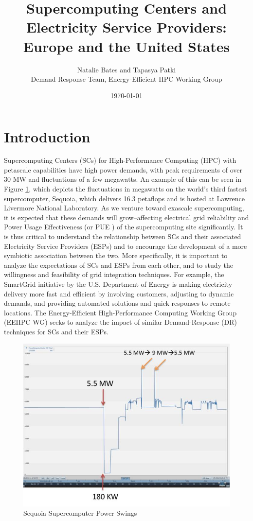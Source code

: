 \documentclass{article}
\title{Supercomputing Centers and Electricity Service Providers: Europe and the United States}
\author{Natalie Bates and Tapasya Patki \\ Demand Response Team, Energy-Efficient HPC Working Group}
\date{\today}
\begin{document}
\fontsize{10}{15}
\selectfont
\maketitle
\section{Introduction}

Supercomputing Centers (SCs) for High-Performance Computing (HPC) with petascale capabilities have high power demands, with peak requirements of over 30 MW and fluctuations of a few megawatts. An example of this can be seen in Figure \ref{fig:seq}, which depicts the fluctuations in megawatts on the world's third fastest supercomputer, Sequoia, which delivers 16.3 petaflops and is hosted at Lawrence Livermore National Laboratory. As we venture toward exascale supercomputing, it is expected that these demands will grow--affecting electrical grid reliability and Power Usage Effectiveness (or PUE \cite{patterson2013tue}) of the supercomputing site significantly. It is thus critical to understand the relationship between SCs and their associated Electricity Service Providers (ESPs) and to encourage the development of a more symbiotic association between the two. More specifically, it is important to analyze the expectations of SCs and ESPs from each other, and to study the willingness and feasibility of grid integration techniques. For example, the SmartGrid initiative \cite{SmartGrid} by the U.S. Department of Energy is making electricity delivery more fast and efficient by involving customers, adjusting to dynamic demands, and providing automated solutions and quick responses to remote locations. The Energy-Efficient High-Performance Computing Working Group (EEHPC WG) seeks to analyze the impact of similar Demand-Response (DR) techniques for SCs and their ESPs. 

\begin{figure}
\begin{center}
\includegraphics[scale=0.7]{figs/Sequoia.jpg}
\caption{Sequoia Supercomputer Power Swings}
\label{fig:seq}
\end{center}
\end{figure}
\end{document}
